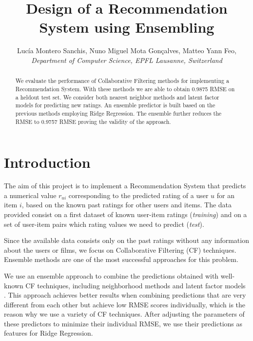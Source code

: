 \documentclass[10pt,conference,compsocconf]{IEEEtran}
\begin{document}
\title{Design of a Recommendation System using Ensembling}

\author{
  Luc\'{i}a Montero Sanchis, Nuno Miguel Mota Gon\c{c}alves, Matteo Yann Feo,  \\
  \textit{Department of Computer Science, EPFL Lausanne, Switzerland}
}

\maketitle

\begin{abstract}
  We evaluate the performance of  Collaborative Filtering methods for implementing a Recommendation System. With these methods we are able to obtain 0.9875 RMSE on a heldout test set. We consider both nearest neighbor methods and latent factor models for predicting new ratings. An ensemble predictor is built based on the previous methods employing Ridge Regression. The ensemble further reduces the RMSE to 0.9757 RMSE proving the validity of the approach.
\end{abstract}

\section{Introduction}
	The aim of this project is to implement a Recommendation System that predicts a numerical value $r_{ui}$ corresponding to the predicted rating of a user $u$ for an item $i$, based on the known past ratings for other users and items. The data provided consist on a first dataset of known user-item ratings (\emph{training}) and on a set of user-item pairs which rating values we need to predict (\emph{test}).

  Since the available data consists only on the past ratings without any information about the users or films, we focus on Collaborative Filtering (CF) techniques. Ensemble methods are one of the most successful approaches for this problem.

  We use an ensemble approach to combine the predictions obtained with well-known CF techniques, including neighborhood methods and latent factor models \cite{koren2009matrix}. This approach achieves better results when combining predictions that are very different from each other but achieve low RMSE scores individually, which is the reason why we use a variety of CF techniques. After adjusting the parameters of these predictors to minimize their individual RMSE, we use their predictions as features for Ridge Regression.
\end{document}
